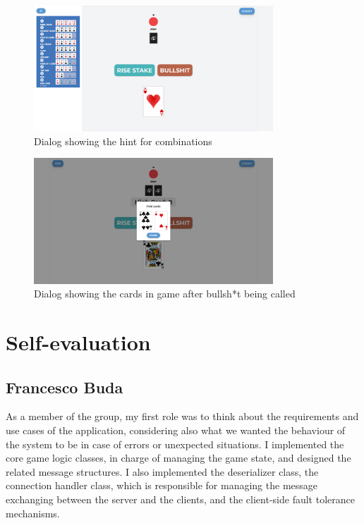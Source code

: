 \documentclass{scrartcl}
\begin{document}
\begin{figure}
      \centering
      \includegraphics[width=0.8\textwidth]{figures/hintScreenshot.png}
      \caption{Dialog showing the hint for combinations}
      \label{fig:screenshot7}
\end{figure}

\begin{figure}
      \centering
      \includegraphics[width=0.8\textwidth]{figures/cardsInGameScreenshot.png}
      \caption{Dialog showing the cards in game after bullsh*t being called}
      \label{fig:screenshot8}
\end{figure}

\newpage
\section{Self-evaluation}\label{self-evaluation}
\subsection{Francesco Buda}\label{francesco-buda}
As a member of the group, my first role was to think about the requirements and use cases of the application,
considering also what we wanted the behaviour of the system to be in case of errors or unexpected situations.
I implemented the core game logic classes, in charge of managing the game state, and designed the related 
message structures. I also implemented the deserializer class, the connection handler class, which is
responsible for managing the message exchanging between the server and the clients, and the client-side fault
tolerance mechanisms.
\end{document}
